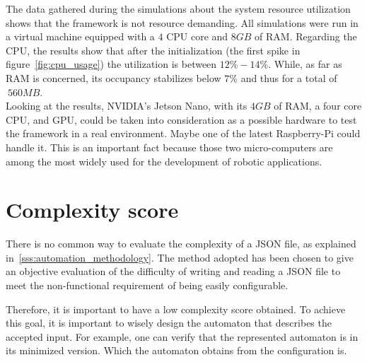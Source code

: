 \documentclass[../thesis.tex]{subfiles}
\begin{document}
The data gathered during the simulations about the system resource utilization shows that the framework is not resource demanding. All simulations were run in a virtual machine equipped with a $4$ CPU core and $8GB$ of RAM. Regarding the CPU, the results show that after the initialization (the first spike in figure~\ref{fig:cpu_usage}) the utilization is between $12\% -14\%$. While, as far as RAM is concerned, its occupancy stabilizes below $7\%$ and thus for a total of $~560MB$.\\

Looking at the results, NVIDIA's Jetson Nano, with its $4GB$ of RAM, a four core CPU, and GPU, could be taken into consideration as a possible hardware to test the framework in a real environment. Maybe one of the latest Raspberry-Pi could handle it. This is an important fact because those two micro-computers are among the most widely used for the development of robotic applications.
 
\section{Complexity score}
There is no common way to evaluate the complexity of a JSON file, as explained in~\ref{sss:automation_methodology}. The method adopted has been chosen to give an objective evaluation of the difficulty of writing and reading a JSON file to meet the non-functional requirement of being easily configurable.

Therefore, it is important to have a low complexity score obtained. To achieve this goal, it is important to wisely design the automaton that describes the accepted input. For example, one can verify that the represented automaton is in its minimized version. Which the automaton obtains from the configuration is.
\end{document}
